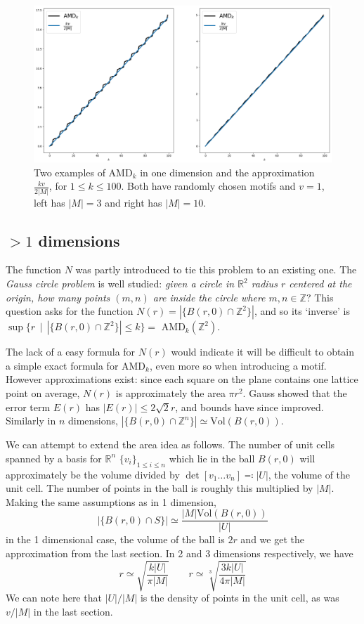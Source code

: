 \documentclass[11pt]{article}
\theoremstyle{definition}
\begin{document}
\begin{figure}[h]
\centering
\includegraphics[scale=0.36]{subplots.png}
\caption{Two examples of AMD$_k$ in one dimension and the approximation $\frac{kv}{2|M|}$, for $1\leq k\leq 100$. Both have randomly chosen motifs and $v=1$, left has $|M|=3$ and right has $|M|=10$.}
\label{amd-line}
\end{figure}

\subsection{$> 1$ dimensions} \label{>1dim}

The function $N$ was partly introduced to tie this problem to an existing one. The \emph{Gauss circle problem} is well studied: \emph{given a circle in $\mathbb{R}^2$ radius $r$ centered at the origin, how many points $(m,n)$ are inside the circle where $m,n\in\mathbb{Z}?$} This question asks for the function $N(r) = |\{B(r,0) \cap \mathbb{Z}^2\}|$, and so its `inverse' is $\sup\{r \,\mid \, |\{B(r,0) \cap \mathbb{Z}^2\}|\leq k\}=$ AMD$_k(\mathbb{Z}^2)$. 

The lack of a easy formula for $N(r)$ would indicate it will be difficult to obtain a simple exact formula for AMD$_k$, even more so when introducing a motif. However approximations exist: since each square on the plane contains one lattice point on average, $N(r)$ is approximately the area $\pi r^2$. Gauss showed \cite{GHH} that the error term $E(r)$ has $|E(r)|\leq 2\sqrt{2}r$, and bounds have since improved. Similarly in $n$ dimensions, $|\{B(r,0) \cap \mathbb{Z}^n\}|\simeq \text{Vol}(B(r,0))$.

We can attempt to extend the area idea as follows. The number of unit cells spanned by a basis for $\mathbb{R}^n$ $\{v_i\}_{1\leq i \leq n}$ which lie in the ball $B(r,0)$ will approximately be the volume divided by $\det [v_1\dots v_n] \eqqcolon |U|$, the volume of the unit cell. The number of points in the ball is roughly this multiplied by $|M|$. Making the same assumptions as in 1 dimension,
\[
|\{B(r,0)\cap S\}| \simeq \frac{|M| \text{Vol}(B(r,0))}{|U|}
\]
in the 1 dimensional case, the volume of the ball is $2r$ and we get the approximation from the last section. In 2 and 3 dimensions respectively, we have
\[
r \simeq \sqrt{\frac{k|U|}{\pi |M|}} \qquad r \simeq \sqrt[3]{\frac{3k|U|}{4\pi |M|}} 
\]
We can note here that $|U|/|M|$ is the density of points in the unit cell, as was $v/|M|$ in the last section.
\end{document}
